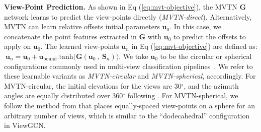 \documentclass[10pt,twocolumn,letterpaper]{article}
\newcommand{\eqLabel}[1]{{Eq (#1)}}
\newcommand{\mysection}[1]{\noindent\textbf{#1.}}
\begin{document}
\begin{table}[t]
\tabcolsep=0.08cm
    \centering
{}
\vspace{2pt}
    \caption{\textbf{3D Point Cloud Classification on ScanObjectNN}. We compare the performance of MVTN in 3D point cloud classification on three different variants of ScanObjectNN \cite{scanobjectnn}. The variants include object with background, object only, and the hardest variant.}
    \label{tab:Scanobjectnn}
\end{table}

\mysection{View-Point Prediction}
As shown in \eqLabel{\ref{eq:mvt-objective}}, the MVTN $\mathbf{G}$ network learns to predict the view-points directly (\textit{MVTN-direct}). Alternatively, MVTN can learn relative offsets \wrt initial parameters $\mathbf{u}_0$. In this case, we concatenate the point features extracted in $\mathbf{G}$ with $\mathbf{u}_0$ to predict the offsets to apply on $\mathbf{u}_0$.
The learned view-points $\mathbf{u}_n$ in \eqLabel{\ref{eq:mvt-objective}} are defined as: $~ \mathbf{u}_n = \mathbf{u}_0 + \mathbf{u}_{\text{bound}}.\text{tanh}\big( \mathbf{G}(\mathbf{u}_0~,~\mathbf{S}_n)\big)$. 
We take $\mathbf{u}_0$ to be the circular or spherical configurations commonly used in multi-view classification pipelines~\cite{mvcnn,mvrotationnet,mvviewgcn}.
We refer to these learnable variants as \textit{MVTN-circular} and \textit{MVTN-spherical}, accordingly. 
For MVTN-circular, the initial elevations for the views are  30$^\circ$, and the azimuth angles are equally distributed over 360$^\circ$ following \cite{mvcnn}. For MVTN-spherical, we follow the method from \cite{spherical-config} that places equally-spaced view-points on a sphere for an arbitrary number of views, which is similar to the ``dodecahedral'' configuration in ViewGCN. 
\end{document}
